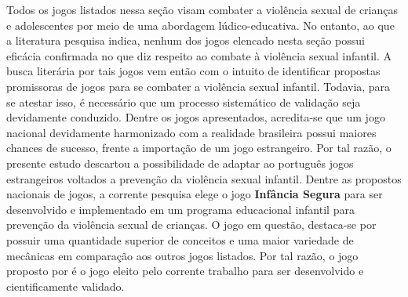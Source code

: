 Todos os jogos listados nessa seção visam combater a violência sexual de crianças e adolescentes por meio de uma abordagem lúdico-educativa. No entanto, ao que a literatura pesquisa indica, nenhum dos jogos elencado nesta seção possui eficácia confirmada no que diz respeito ao combate à violência sexual infantil. A busca literária por tais jogos vem então com o intuito de identificar propostas promissoras de jogos para se combater a violência sexual infantil. Todavia, para se atestar isso, é necessário que um processo sistemático de validação seja devidamente conduzido. Dentre os jogos apresentados, acredita-se que um jogo nacional devidamente harmonizado com a realidade brasileira possui maiores chances de sucesso, frente a importação de um jogo estrangeiro. Por tal razão, o presente estudo descartou a possibilidade de adaptar ao português jogos estrangeiros voltados a prevenção da violência sexual infantil. Dentre as propostos nacionais de jogos, a corrente pesquisa elege o jogo \textbf{Infância Segura} para ser desenvolvido e implementado em um programa educacional infantil para prevenção da violência sexual de crianças. O jogo em questão, destaca-se por possuir uma quantidade superior de conceitos e uma maior variedade de mecânicas em comparação aos outros jogos listados. Por tal razão, o jogo proposto por  é o jogo eleito pelo corrente trabalho para ser desenvolvido e cientificamente validado.